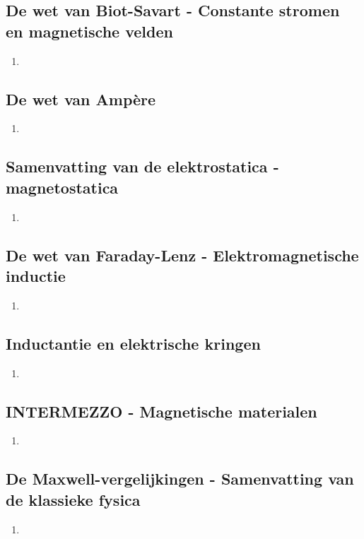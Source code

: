\documentclass[12pt]{article}
\begin{document}
    \subsection{De wet van Biot-Savart - Constante stromen en magnetische velden}
    \begin{enumerate}
        \item 
    \end{enumerate}
    \subsection{De wet van Ampère}
    \begin{enumerate}
        \item 
    \end{enumerate}
    \subsection{Samenvatting van de elektrostatica - magnetostatica}
    \begin{enumerate}
        \item 
    \end{enumerate}
    \subsection{De wet van Faraday-Lenz - Elektromagnetische inductie}
    \begin{enumerate}
        \item 
    \end{enumerate}
    \subsection{Inductantie en elektrische kringen}
    \begin{enumerate}
        \item 
    \end{enumerate}
    \subsection{INTERMEZZO - Magnetische materialen}
    \begin{enumerate}
        \item 
    \end{enumerate}
    \subsection{De Maxwell-vergelijkingen - Samenvatting van de klassieke fysica}
    \begin{enumerate}
        \item 
    \end{enumerate}
\end{document}
